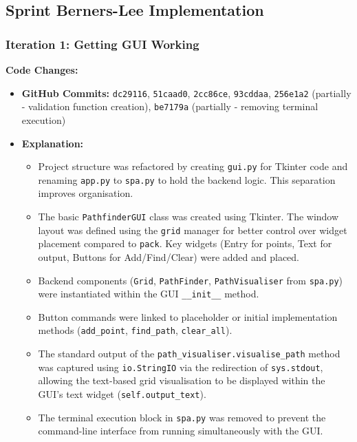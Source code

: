 \clearpage
\subsection{Sprint Berners-Lee Implementation}

\subsubsection{Iteration 1: Getting GUI Working}

\textbf{Code Changes:}
\begin{itemize}
	\item \textbf{GitHub Commits:} \verb|dc29116|, \verb|51caad0|, \verb|2cc86ce|, \verb|93cddaa|, \verb|256e1a2| (partially - validation function creation), \verb|be7179a| (partially - removing terminal execution)
	\item \textbf{Explanation:}
	\begin{itemize}
		\item Project structure was refactored by creating \verb|gui.py| for Tkinter code and renaming \verb|app.py| to \verb|spa.py| to hold the backend logic. This separation improves organisation.
		\item The basic \verb|PathfinderGUI| class was created using Tkinter. The window layout was defined using the \verb|grid| manager for better control over widget placement compared to \verb|pack|. Key widgets (Entry for points, Text for output, Buttons for Add/Find/Clear) were added and placed.
		\item Backend components (\verb|Grid|, \verb|PathFinder|, \verb|PathVisualiser| from \verb|spa.py|) were instantiated within the GUI \verb|__init__| method.
		\item Button commands were linked to placeholder or initial implementation methods (\verb|add_point|, \verb|find_path|, \verb|clear_all|).
		\item The standard output of the \verb|path_visualiser.visualise_path| method was captured using \verb|io.StringIO| via the redirection of \verb|sys.stdout|, allowing the text-based grid visualisation to be displayed within the GUI's text widget (\verb|self.output_text|).
		\item The terminal execution block in \verb|spa.py| was removed to prevent the command-line interface from running simultaneously with the GUI.
	\end{itemize}
\end{itemize}

